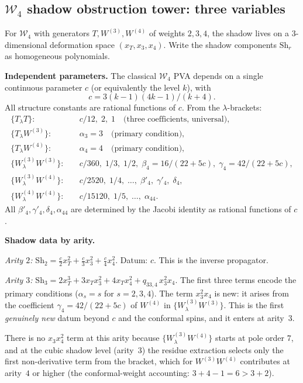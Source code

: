 \documentclass[11pt]{article}
\newcommand{\cW}{\mathcal{W}}
\begin{document}
\subsection*{$\cW_4$ shadow obstruction tower: three variables}

For $\cW_4$ with generators $T, W^{(3)}, W^{(4)}$ of weights
$2, 3, 4$, the shadow lives on a $3$-dimensional deformation
space $(x_T, x_3, x_4)$.  Write the shadow components
$\mathrm{Sh}_r$ as homogeneous polynomials.

\medskip
\noindent\textbf{Independent parameters.}
The classical $\cW_4$ PVA depends on a single continuous
parameter $c$ (or equivalently the level $k$), with
\[
c = 3(k-1)(4k-1)/(k+4).
\]
All structure constants are rational functions of $c$.
From the $\lambda$-brackets:
\begin{align*}
\{T_\lambda T\}: &\quad c/12, \; 2, \; 1
  \quad\text{(three coefficients, universal)}, \\
\{T_\lambda W^{(3)}\}: &\quad \alpha_3 = 3
  \quad\text{(primary condition)}, \\
\{T_\lambda W^{(4)}\}: &\quad \alpha_4 = 4
  \quad\text{(primary condition)}, \\
\{W^{(3)}_\lambda W^{(3)}\}: &\quad
  c/360,\; 1/3,\; 1/2,\; \beta_4 = 16/(22{+}5c),\;
  \gamma_4 = 42/(22{+}5c), \\
\{W^{(3)}_\lambda W^{(4)}\}: &\quad
  c/2520,\; 1/4,\; \ldots,\; \beta'_4,\; \gamma'_4,\; \delta_4, \\
\{W^{(4)}_\lambda W^{(4)}\}: &\quad
  c/15120,\; 1/5,\; \ldots,\; \alpha_{44}.
\end{align*}
All $\beta'_4, \gamma'_4, \delta_4, \alpha_{44}$ are determined
by the Jacobi identity as rational functions of $c$.

\medskip
\noindent\textbf{Shadow data by arity.}

\emph{Arity $2$:}
$\mathrm{Sh}_2 = \frac{c}{2}x_T^2 + \frac{c}{3}x_3^2
  + \frac{c}{4}x_4^2$.
Datum: $c$.  This is the inverse propagator.

\emph{Arity $3$:}
$\mathrm{Sh}_3 = 2x_T^3 + 3x_T x_3^2 + 4x_T x_4^2
  + q_{33,4}\, x_3^2 x_4$.
The first three terms encode the primary conditions
($\alpha_s = s$ for $s = 2, 3, 4$).  The term $x_3^2 x_4$ is
new: it arises from the coefficient $\gamma_4 = 42/(22{+}5c)$
of $W^{(4)}$ in $\{W^{(3)}_\lambda W^{(3)}\}$.  This is the
first \emph{genuinely new} datum beyond $c$ and the conformal
spins, and it enters at arity~$3$.

There is no $x_3 x_4^2$ term at this arity because
$\{W^{(3)}_\lambda W^{(4)}\}$ starts at pole order $7$, and
at the cubic shadow level (arity~$3$) the residue extraction
selects only the first non-derivative term from the bracket,
which for $W^{(3)}W^{(4)}$ contributes at arity~$4$ or higher
(the conformal-weight accounting: $3 + 4 - 1 = 6 > 3 + 2$).
\end{document}
